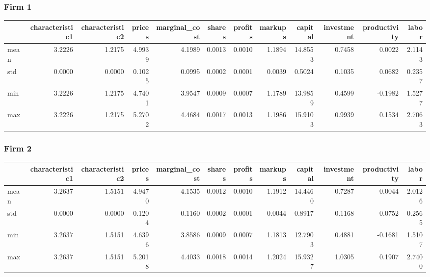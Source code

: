  \subsubsection*{Firm 1}
\begin{tabular}{lrrrrrrrrrrr}
\toprule
{} &  characteristic1 &  characteristic2 &  prices &  marginal\_cost &  shares &  profits &  markups &  capital &  investment &  productivity &  labor \\
\midrule
mean &           3.2226 &           1.2175 &  4.9939 &         4.1989 &  0.0013 &   0.0010 &   1.1894 &  14.8553 &      0.7458 &        0.0022 & 2.1143 \\
std  &           0.0000 &           0.0000 &  0.1025 &         0.0995 &  0.0002 &   0.0001 &   0.0039 &   0.5024 &      0.1035 &        0.0682 & 0.2357 \\
min  &           3.2226 &           1.2175 &  4.7401 &         3.9547 &  0.0009 &   0.0007 &   1.1789 &  13.9859 &      0.4599 &       -0.1982 & 1.5277 \\
max  &           3.2226 &           1.2175 &  5.2702 &         4.4684 &  0.0017 &   0.0013 &   1.1986 &  15.9103 &      0.9939 &        0.1534 & 2.7063 \\
\bottomrule
\end{tabular}


 \subsubsection*{Firm 2}
\begin{tabular}{lrrrrrrrrrrr}
\toprule
{} &  characteristic1 &  characteristic2 &  prices &  marginal\_cost &  shares &  profits &  markups &  capital &  investment &  productivity &  labor \\
\midrule
mean &           3.2637 &           1.5151 &  4.9470 &         4.1535 &  0.0012 &   0.0010 &   1.1912 &  14.4460 &      0.7287 &        0.0044 & 2.0126 \\
std  &           0.0000 &           0.0000 &  0.1204 &         0.1160 &  0.0002 &   0.0001 &   0.0044 &   0.8917 &      0.1168 &        0.0752 & 0.2565 \\
min  &           3.2637 &           1.5151 &  4.6396 &         3.8586 &  0.0009 &   0.0007 &   1.1813 &  12.7903 &      0.4881 &       -0.1681 & 1.5107 \\
max  &           3.2637 &           1.5151 &  5.2018 &         4.4033 &  0.0018 &   0.0014 &   1.2024 &  15.9327 &      1.0305 &        0.1907 & 2.7400 \\
\bottomrule
\end{tabular}


